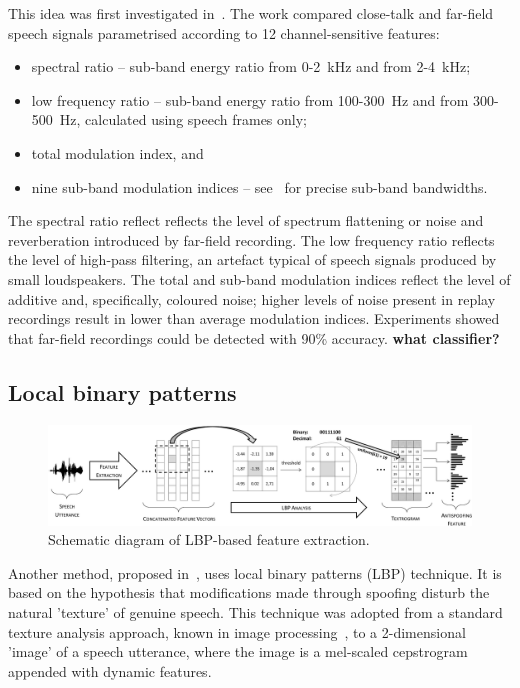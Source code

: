 This idea was first investigated in~\cite{Villalba2011}.  The work compared close-talk and far-field speech signals parametrised according to 12 channel-sensitive features:


\begin{itemize}
\item spectral ratio -- sub-band energy ratio from 0-2~kHz and from 2-4~kHz; 
\item low frequency ratio -- sub-band energy ratio from 100-300~Hz and from 300-500~Hz, calculated using speech frames only;
\item total modulation index, and
\item nine sub-band modulation indices -- see~\cite{Villalba2011} for precise sub-band bandwidths.
\end{itemize}


The spectral ratio reflect reflects the level of spectrum flattening or noise and reverberation introduced by far-field recording.  The low frequency ratio reflects the level of high-pass filtering, an artefact typical of speech signals  produced by small loudspeakers.  The total and sub-band modulation indices reflect the level of additive and, specifically, coloured noise; higher levels of noise present in replay recordings result in lower than average modulation indices.  Experiments showed that far-field recordings could be detected with 90\%  accuracy.  {\bfseries what classifier?}



\subsection{Local binary patterns}


\begin{figure}
	\includegraphics[width=1\linewidth]{Figs/LBPfeature.pdf}
	\caption{Schematic diagram of LBP-based feature extraction.}
	\label{fig:LBPfeature}
\end{figure}


Another method, proposed in~\cite{Alegre2013a}, uses local binary patterns (LBP) technique. It is based on the hypothesis that modifications made through spoofing disturb the natural 'texture' of genuine speech. This technique was adopted from a standard texture analysis approach, known in image processing~\cite{Ojala2002}, to a 2-dimensional 'image' of a speech utterance, where the image is a mel-scaled cepstrogram appended with dynamic features. 

